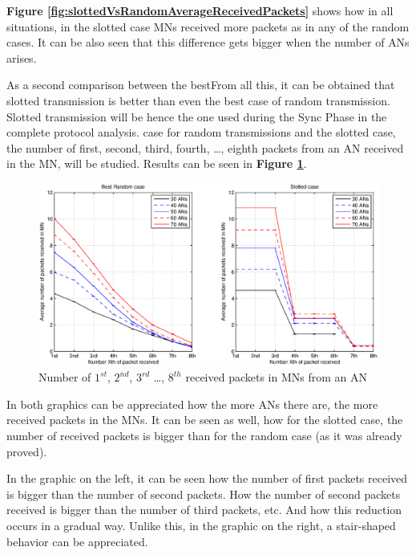\textbf{Figure \ref{fig:slottedVsRandomAverageReceivedPackets}} shows how in all situations, in the slotted case \acp{MN} received more packets as in
any of the random cases. It can be also seen that this difference gets bigger when the number of \acp{AN} arises.

As a second comparison between the bestFrom all this, it can be obtained that slotted transmission is better than even the best case of random transmission. Slotted transmission will be hence
the one used during the Sync Phase in the complete protocol analysis. case for random transmissions and the slotted case, the number of first, second, third, fourth, \ldots, eighth
packets from an \ac{AN} received in the \ac{MN}, will be studied. Results can be seen in \textbf{Figure \ref{fig:numberOf1st2ndPacketsReceived}}.

\begin{figure}[ht]
 \begin{center}
  \includegraphics[width=1\textwidth]{numberOf1st2ndPacketsReceived.eps}
 \end{center}
 \caption{Number of $1^{st}$, $2^{nd}$, $3^{rd}$ \ldots, $8^{th}$ received packets in \acp{MN} from an \ac{AN}}
 \label{fig:numberOf1st2ndPacketsReceived}
\end{figure}

In both graphics can be appreciated how the more \acp{AN} there are, the more received packets in the \acp{MN}. It can be seen as well, how
for the slotted case, the number of received packets is bigger than for the random case (as it was already proved).

In the graphic on the left, it can be seen how the number of first packets received is bigger than the number of second packets. How the number of 
second packets received is bigger than the number of third packets, etc. And how this reduction occurs in a gradual way. Unlike this, in the graphic 
on the right, a stair-shaped behavior can be appreciated.

